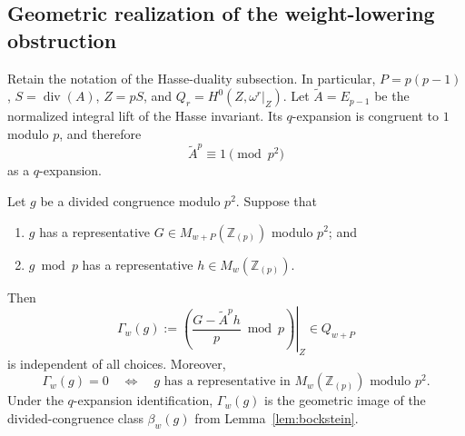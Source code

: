 \subsection{Geometric realization of the weight-lowering obstruction}

Retain the notation of the Hasse-duality subsection.  In particular,
$P=p(p-1)$, $S=\operatorname{div}(A)$, $Z=pS$, and
$Q_r=H^0(Z,\omega^r\vert_Z)$.  Let $\widetilde A=E_{p-1}$ be the
normalized integral lift of the Hasse invariant.  Its $q$-expansion is
congruent to $1$ modulo $p$, and therefore
\begin{equation}\label{eq:hasse-p-lift}
 \widetilde A^p\equiv1\pmod {p^2}
\end{equation}
as a $q$-expansion.

\begin{proposition}
\label{prop:geometric-bockstein}
Let $g$ be a divided congruence modulo $p^2$.  Suppose that
\begin{enumerate}
\item $g$ has a representative $G\in M_{w+P}(\mathbb Z_{(p)})$ modulo
      $p^2$; and
\item $g\bmod p$ has a representative $h\in M_w(\mathbb Z_{(p)})$.
\end{enumerate}
Then
\[
 \Gamma_w(g):=
 \left.\left(\frac{G-\widetilde A^p h}{p}\bmod p\right)\right|_Z
 \in Q_{w+P}
\]
is independent of all choices.  Moreover,
\[
 \Gamma_w(g)=0
 \quad\Longleftrightarrow\quad
 g\text{ has a representative in }M_w(\mathbb Z_{(p)})
       \text{ modulo }p^2.
\]
Under the $q$-expansion identification, $\Gamma_w(g)$ is the geometric
image of the divided-congruence class $\beta_w(g)$ from
Lemma~\ref{lem:bockstein}.
\end{proposition}

